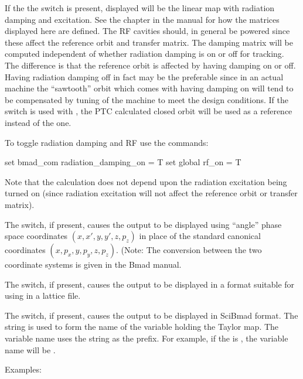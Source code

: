 {{{{{{{{{{{If the the  switch is present, displayed will be the linear map with radiation
damping and excitation. See the  chapter in the \bmad manual for how the
matrices displayed here are defined. The RF cavities should, in general be powered since these
affect the reference orbit and transfer matrix. The damping matrix will be computed independent of
whether radiation damping is on or off for tracking. The difference is that the reference orbit is
affected by having damping on or off. Having radiation damping off in fact may be the preferable
since in an actual machine the ``sawtooth'' orbit which comes with having damping on will tend to be
compensated by tuning of the machine to meet the design conditions. If the  switch is used
with , the PTC calculated closed orbit will be used as a reference instead of the
\bmad one.

To toggle radiation damping and RF use the commands:
\begin{example}
  set bmad_com radiation_damping_on = T
  set global rf_on = T
\end{example}
Note that the calculation does not depend upon the radiation excitation being turned on (since
radiation excitation will not affect the reference orbit or transfer matrix).

The  switch, if present, causes the output to be displayed using ``angle''
phase space coordinates $(x, x', y, y', z, p_z)$ in place of the standard \bmad canonical
coordinates $(x, p_x, y, p_y, z, p_z)$. (Note: The conversion between the two coordinate systems is
given in the Bmad manual.

The  switch, if present, causes the output to be displayed in a format suitable
for using in a \bmad lattice file.

The  switch, if present, causes the output to be displayed in SciBmad
format. The  string is used to form the name of the variable holding the Taylor
map. The variable name uses the string  as the prefix. For example, if the  is
, the variable name will be .

Examples:

}}}}}}}}}}}
